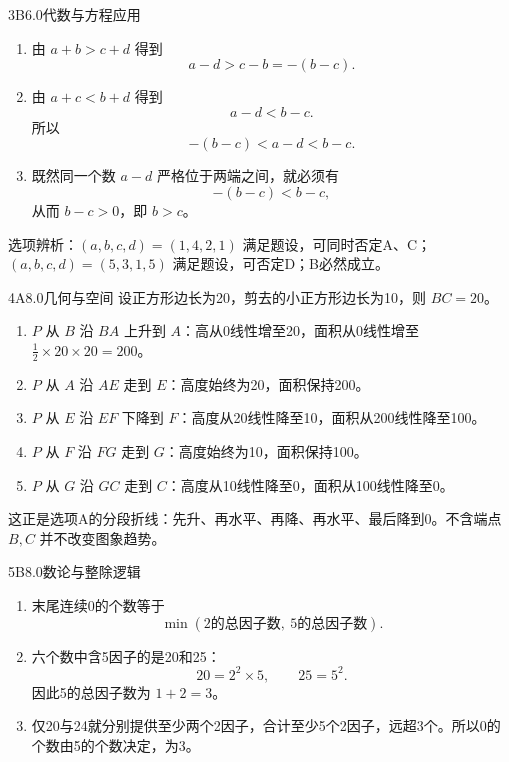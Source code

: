 \begin{solution}{3}{B}{6.0}{代数与方程应用}
\begin{enumerate}[label=\textbf{Step \arabic*:},leftmargin=*]
\item 由 \(a+b>c+d\) 得到
\[
  a-d>c-b=-(b-c).
\]
\item 由 \(a+c<b+d\) 得到
\[
  a-d<b-c.
\]
所以
\[
  -(b-c)<a-d<b-c.
\]
\item 既然同一个数 \(a-d\) 严格位于两端之间，就必须有
\[
  -(b-c)<b-c,
\]
从而 \(b-c>0\)，即 \(b>c\)。
\end{enumerate}
选项辨析：\((a,b,c,d)=(1,4,2,1)\) 满足题设，可同时否定A、C；\((a,b,c,d)=(5,3,1,5)\) 满足题设，可否定D；B必然成立。
\end{solution}

\begin{solution}{4}{A}{8.0}{几何与空间}
设正方形边长为20，剪去的小正方形边长为10，则 \(BC=20\)。
\begin{enumerate}[label=\textbf{Step \arabic*:},leftmargin=*]
\item \(P\) 从 \(B\) 沿 \(BA\) 上升到 \(A\)：高从0线性增至20，面积从0线性增至 \( \frac12\times20\times20=200 \)。
\item \(P\) 从 \(A\) 沿 \(AE\) 走到 \(E\)：高度始终为20，面积保持200。
\item \(P\) 从 \(E\) 沿 \(EF\) 下降到 \(F\)：高度从20线性降至10，面积从200线性降至100。
\item \(P\) 从 \(F\) 沿 \(FG\) 走到 \(G\)：高度始终为10，面积保持100。
\item \(P\) 从 \(G\) 沿 \(GC\) 走到 \(C\)：高度从10线性降至0，面积从100线性降至0。
\end{enumerate}
这正是选项A的分段折线：先升、再水平、再降、再水平、最后降到0。不含端点 \(B,C\) 并不改变图象趋势。
\end{solution}

\begin{solution}{5}{B}{8.0}{数论与整除逻辑}
\begin{enumerate}[label=\textbf{Step \arabic*:},leftmargin=*]
\item 末尾连续0的个数等于
\[
  \min(\text{2的总因子数},\ \text{5的总因子数}).
\]
\item 六个数中含5因子的是20和25：
\[
  20=2^2\times5,\qquad 25=5^2.
\]
因此5的总因子数为 \(1+2=3\)。
\item 仅20与24就分别提供至少两个2因子，合计至少5个2因子，远超3个。所以0的个数由5的个数决定，为3。
\end{enumerate}
\end{solution}

